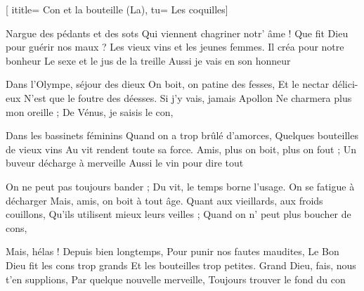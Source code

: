  [
ititle= {Con et la bouteille (La)},
tu= {Les coquilles}]


\beginverse
Nargue des pédants et des sots
Qui viennent chagriner notr' âme !
Que fit Dieu pour guérir nos maux ?
Les vieux vins et les jeunes femmes.
Il créa pour notre bonheur
Le sexe et le jus de la treille
Aussi je vais en son honneur
\endverse

\beginverse
Dans l'Olympe, séjour des dieux
On boit, on patine des fesses,
Et le nectar délici-eux
N'est que le foutre des déesses.
Si j'y vais, jamais Apollon
Ne charmera plus mon oreille ;
De Vénus, je saisis le con,
\endverse

\beginverse
Dans les bassinets féminins
Quand on a trop brûlé d'amorces,
Quelques bouteilles de vieux vins
Au vit rendent toute sa force.
Amis, plus on boit, plus on fout ;
Un buveur décharge à merveille
Aussi le vin pour dire tout
\endverse

\beginverse
On ne peut pas toujours bander ;
Du vit, le temps borne l'usage.
On se fatigue à décharger
Mais, amis, on boit à tout âge.
Quant aux vieillards, aux froids couillons,
Qu'ils utilisent mieux leurs veilles ;
Quand on n' peut plus boucher de cons,
\endverse

\beginverse
Mais, hélas ! Depuis bien longtemps,
Pour punir nos fautes maudites,
Le Bon Dieu fit les cons trop grands
Et les bouteilles trop petites.
Grand Dieu, fais, nous t'en supplions,
Par quelque nouvelle merveille,
Toujours trouver le fond du con
\endverse

\endsong
